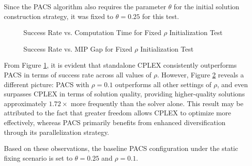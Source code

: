 Since the PACS algorithm also requires the parameter $\theta$ for the initial solution construction strategy, it was fixed to $\theta = 0.25$ for this test.  

\begin{figure}[H]
    \centering
    \begin{minipage}{0.6\columnwidth}
        \centering
        \resizebox{\linewidth}{!}{}
    \end{minipage}%
    \hfill
    \begin{minipage}{0.4\columnwidth}
        \centering
        \resizebox{\linewidth}{!}{}
    \end{minipage}
    \caption{Success Rate vs. Computation Time for Fixed $\rho$ Initialization Test}
    \label{fig:PACS_STD_SuccRate}
\end{figure}

\begin{figure}[H]
    \centering
    \begin{minipage}{0.6\columnwidth}
        \centering
        \resizebox{\linewidth}{!}{}
    \end{minipage}%
    \hfill
    \begin{minipage}{0.4\columnwidth}
        \centering
        \resizebox{\linewidth}{!}{}
    \end{minipage}
    \caption{Success Rate vs. MIP Gap for Fixed $\rho$ Initialization Test}
    \label{fig:PACS_STD_MGAP}
\end{figure}
From Figure \ref{fig:PACS_STD_SuccRate}, it is evident that standalone CPLEX consistently outperforms PACS in terms of success rate across all values of $\rho$.  
However, Figure \ref{fig:PACS_STD_MGAP} reveals a different picture: PACS with $\rho = 0.1$ outperforms all other settings of $\rho$, and even surpasses CPLEX in terms of solution quality, providing higher-quality solutions approximately $1.72\times$ more frequently than the solver alone.
This result may be attributed to the fact that greater freedom allows CPLEX to optimize more effectively, whereas PACS primarily benefits from enhanced diversification through its parallelization strategy.

Based on these observations, the baseline PACS configuration under the static fixing scenario is set to $\theta = 0.25$ and $\rho = 0.1$.

